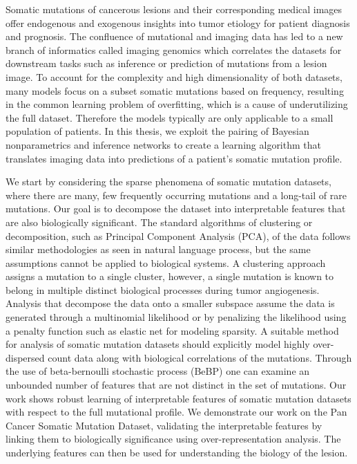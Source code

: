 Somatic mutations of cancerous lesions and their corresponding medical images offer endogenous and exogenous insights into tumor etiology for patient diagnosis and prognosis.  The confluence of mutational and imaging data has led to a new branch of informatics called imaging genomics which correlates the datasets for downstream tasks such as inference or prediction of mutations from a lesion image.  To account for the complexity and high dimensionality of both datasets, many models focus on a subset somatic mutations based on frequency, resulting in the common learning problem of overfitting, which is a cause of underutilizing the full dataset.  Therefore the models typically are only applicable to a small population of patients.  In this thesis, we exploit the pairing of Bayesian nonparametrics and inference networks to create a learning algorithm that translates imaging data into predictions of a patient's somatic mutation profile.

We start by considering the sparse phenomena of somatic mutation datasets, where there are many, few frequently occurring mutations and a long-tail of rare mutations.  Our goal is to decompose the dataset into interpretable features that are also biologically significant.  The standard algorithms of clustering or decomposition, such as Principal Component Analysis (PCA), of the data follows similar methodologies as seen in natural language process, but the same assumptions cannot be applied to biological systems.  A clustering approach assigns a mutation to a single cluster, however, a single mutation is known to belong in multiple distinct biological processes during tumor angiogenesis.  Analysis that decompose the data onto a smaller subspace assume the data is generated through a multinomial likelihood or by penalizing the likelihood using a penalty function such as elastic net for modeling sparsity.  A suitable method for analysis of somatic mutation datasets should explicitly model highly over-dispersed count data along with biological correlations of the mutations.  Through the use of beta-bernoulli stochastic process (BeBP) one can examine an unbounded number of features that are not distinct in the set of mutations.  Our work shows robust learning of interpretable features of somatic mutation datasets with respect to the full mutational profile.  We demonstrate our work on the Pan Cancer Somatic Mutation Dataset, validating the interpretable features by linking them to biologically significance using over-representation analysis.  The underlying features can then be used for understanding the biology of the lesion. 


